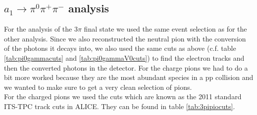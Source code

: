 \subsection{$a_1 \rightarrow \pi^0\pi^{+}\pi^{-}$ analysis}
For the analysis of the 3$\pi$ final state we used the same event selection as for the other analysis. Since we also reconstructed the neutral pion with the conversion of the photons it decays into, we also used the same cuts as above (c.f. table \ref{tab:pi0gammacuts} and \ref{tab:pi0gammaV0cuts}) to find the electron tracks and then the converted photons in the detector. For the charge pions we had to do a bit more worked because they are the most abundant species in a pp collision and we wanted to make sure to get a very clean selection of pions. \\
For the charged pions we used the cuts which are known as the 2011 standard ITS-TPC track cuts in ALICE. They can be found in table \ref{tab:3pipiocuts}. \\
